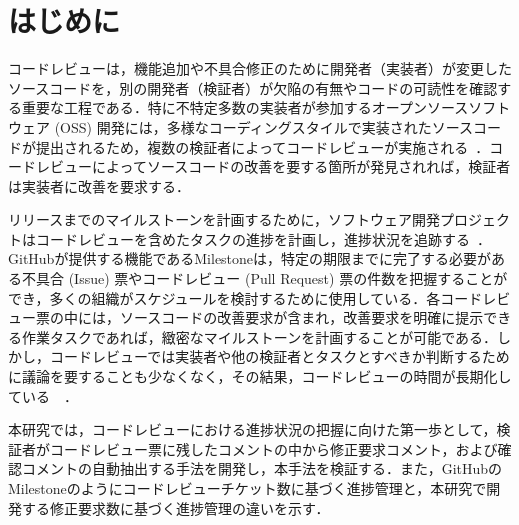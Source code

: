 \documentclass[T,J]{fose} %
\begin{document}
\maketitle \thispagestyle {empty}

\section{はじめに}

コードレビューは，機能追加や不具合修正のために開発者（実装者）が変更したソースコードを，別の開発者（検証者）が欠陥の有無やコードの可読性を確認する重要な工程である\cite{quality1}\cite{quality2}．特に不特定多数の実装者が参加するオープンソースソフトウェア (OSS) 開発には，多様なコーディングスタイルで実装されたソースコードが提出されるため，複数の検証者によってコードレビューが実施される~\cite{review_process}．コードレビューによってソースコードの改善を要する箇所が発見されれば，検証者は実装者に改善を要求する．


リリースまでのマイルストーンを計画するために，ソフトウェア開発プロジェクトはコードレビューを含めたタスクの進捗を計画し，進捗状況を追跡する~\cite{review_time}．GitHubが提供する機能であるMilestoneは，特定の期限までに完了する必要がある不具合 (Issue) 票やコードレビュー (Pull Request) 票の件数を把握することができ，多くの組織がスケジュールを検討するために使用している．各コードレビュー票の中には，ソースコードの改善要求が含まれ，改善要求を明確に提示できる作業タスクであれば，緻密なマイルストーンを計画することが可能である．しかし，コードレビューでは実装者や他の検証者とタスクとすべきか判断するために議論を要することも少なくなく，その結果，コードレビューの時間が長期化している~\cite{review_time1}~\cite{review_time2}．

本研究では，コードレビューにおける進捗状況の把握に向けた第一歩として，検証者がコードレビュー票に残したコメントの中から修正要求コメント，および確認コメントの自動抽出する手法を開発し，本手法を検証する．また，GitHubのMilestoneのようにコードレビューチケット数に基づく進捗管理と，本研究で開発する修正要求数に基づく進捗管理の違いを示す．
\end{document}
